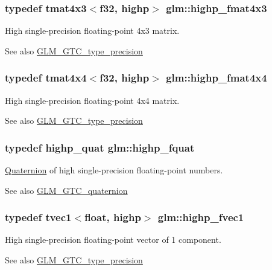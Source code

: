 \subsubsection[{highp\+\_\+fmat4x3}]{\setlength{\rightskip}{0pt plus 5cm}typedef tmat4x3$<${\bf f32}, highp$>$ {\bf glm\+::highp\+\_\+fmat4x3}}\label{namespaceglm_a76d5f04bc31dec799810a4d9d9eb35d2}
High single-\/precision floating-\/point 4x3 matrix. \begin{DoxySeeAlso}{See also}
\hyperlink{group__gtc__type__precision}{G\+L\+M\+\_\+\+G\+T\+C\+\_\+type\+\_\+precision} 
\end{DoxySeeAlso}
\hypertarget{namespaceglm_a57e1bf855a227322e9a9809f03c7f111}{}
\subsubsection[{highp\+\_\+fmat4x4}]{\setlength{\rightskip}{0pt plus 5cm}typedef tmat4x4$<${\bf f32}, highp$>$ {\bf glm\+::highp\+\_\+fmat4x4}}\label{namespaceglm_a57e1bf855a227322e9a9809f03c7f111}
High single-\/precision floating-\/point 4x4 matrix. \begin{DoxySeeAlso}{See also}
\hyperlink{group__gtc__type__precision}{G\+L\+M\+\_\+\+G\+T\+C\+\_\+type\+\_\+precision} 
\end{DoxySeeAlso}
\hypertarget{namespaceglm_ad1acf6af4ae4af94dfec8814b058d5eb}{}
\subsubsection[{highp\+\_\+fquat}]{\setlength{\rightskip}{0pt plus 5cm}typedef {\bf highp\+\_\+quat} {\bf glm\+::highp\+\_\+fquat}}\label{namespaceglm_ad1acf6af4ae4af94dfec8814b058d5eb}
\hyperlink{class_quaternion}{Quaternion} of high single-\/precision floating-\/point numbers.

\begin{DoxySeeAlso}{See also}
\hyperlink{group__gtc__quaternion}{G\+L\+M\+\_\+\+G\+T\+C\+\_\+quaternion} 
\end{DoxySeeAlso}
\hypertarget{namespaceglm_a759ec470a820ed3c0968790d20426020}{}
\subsubsection[{highp\+\_\+fvec1}]{\setlength{\rightskip}{0pt plus 5cm}typedef tvec1$<$float, highp$>$ {\bf glm\+::highp\+\_\+fvec1}}\label{namespaceglm_a759ec470a820ed3c0968790d20426020}
High single-\/precision floating-\/point vector of 1 component. \begin{DoxySeeAlso}{See also}
\hyperlink{group__gtc__type__precision}{G\+L\+M\+\_\+\+G\+T\+C\+\_\+type\+\_\+precision} 
\end{DoxySeeAlso}
\hypertarget{namespaceglm_a7626c78159b590e2db6b8a8e4c2ea655}{}
